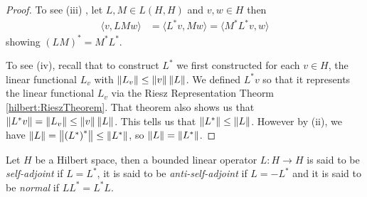 \begin{proof}
To see (iii) , let $L, M \in L(H,H)$ and $v,w \in H$
then
\begin{align*}
  \langle v, L M w \rangle &= \langle L^* v, M w \rangle = \langle M^*
                             L^* v, w \rangle
\end{align*}
showing $\left(LM\right)^* = M^* L^*$.

To see (iv), recall that to construct $L^*$ we first
constructed for each $v \in H$, the linear functional $L_v$ with
$\left \lVert L_v \right \rVert \leq \left \lVert v \right \rVert \left \lVert L \right \rVert$.   We defined $L^* v$ so that it
represents the linear functional $L_v$ via the Riesz Representation
Theorm \ref{hilbert:RieszTheorem}.   That theorem also shows us that
$\left \lVert L^* v \right \rVert = \left \lVert L_v \right \rVert \leq \left \lVert v \right \rVert \left \lVert L \right \rVert$.   This tells us
that $\left \lVert L^* \right \rVert \leq \left \lVert L \right \rVert$.  However by (ii), we have
$\left \lVert L \right \rVert = \left \lVert \left(L^*\right)^* \right \rVert \leq \left \lVert L^* \right \rVert$, so $\left \lVert L \right \rVert =
\left \lVert L^* \right \rVert$. 
\end{proof}

\begin{defn}Let $H$ be a Hilbert space, then a bounded linear operator
  $L: H \to H$ is said to be \emph{self-adjoint} if $L = L^*$, it is
  said to be \emph{anti-self-adjoint} if $L = -L^*$ and it is said to
  be \emph{normal} if $LL^* = L^* L$.
\end{defn}

